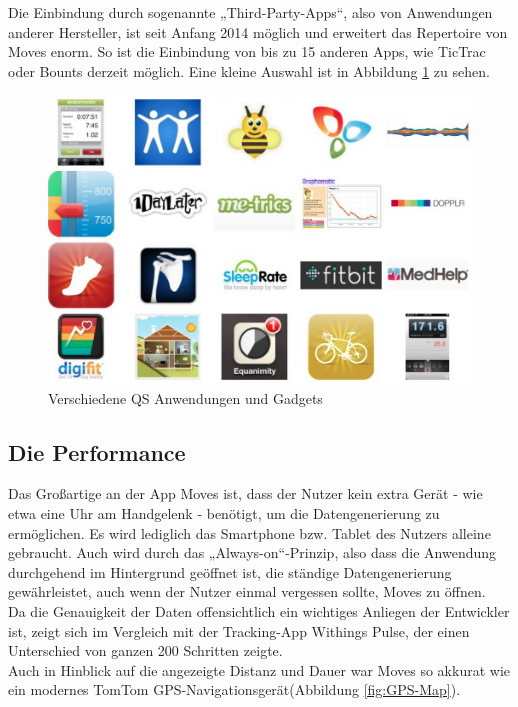 Die Einbindung durch sogenannte „Third-Party-Apps“, also von Anwendungen anderer Hersteller, ist seit Anfang 2014 möglich und erweitert das Repertoire von Moves enorm. 
So ist die Einbindung von bis zu 15 anderen Apps, wie TicTrac oder Bounts derzeit möglich\cite{web:MovesThird}.
Eine kleine Auswahl ist in Abbildung \ref{fig:Anwendungen} zu sehen.
\\

\begin{figure}[H]
 \centering
 \includegraphics[scale=0.5]{images/qs-anwndungen-gadgets.png}
 \caption{Verschiedene QS Anwendungen und Gadgets \cite{fig:Anwendungen}}
 \label{fig:Anwendungen}
\end{figure}

\subsection{Die Performance}
\label{ch:Apps:sec:Moves:subsec:PERF}

Das Großartige an der App Moves ist, dass der Nutzer kein extra Gerät - wie etwa eine Uhr am Handgelenk - benötigt, um die Datengenerierung zu ermöglichen. 
Es wird lediglich das Smartphone bzw. Tablet des Nutzers alleine gebraucht. 
Auch wird durch das „Always-on“-Prinzip, also dass die Anwendung durchgehend im Hintergrund geöffnet ist, die ständige Datengenerierung gewährleistet, auch wenn der Nutzer einmal vergessen sollte, Moves zu öffnen.
\\
Da die Genauigkeit der Daten offensichtlich ein wichtiges Anliegen der Entwickler ist, zeigt sich im Vergleich mit der Tracking-App Withings Pulse, der einen Unterschied von ganzen 200 Schritten zeigte. 
\\
Auch in Hinblick auf die angezeigte Distanz und Dauer war Moves so akkurat wie ein modernes TomTom GPS-Navigationsgerät(Abbildung \ref{fig:GPS-Map}).
\\


